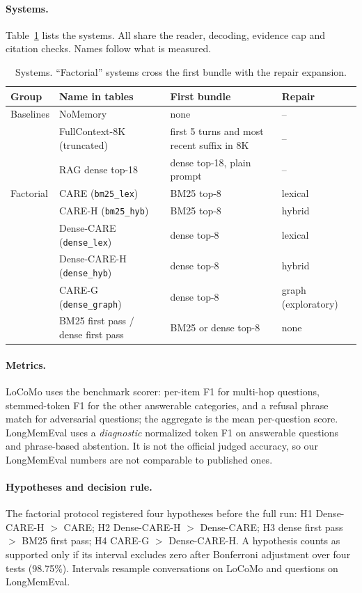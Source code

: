 \documentclass[10pt]{article}
\theoremstyle{plain}
\begin{document}
\paragraph{Systems.} Table~\ref{tab:systems} lists the systems. All share the reader, decoding, evidence cap
and citation checks. Names follow what is measured.

\begin{table}[t]
\centering
\caption{Systems. ``Factorial'' systems cross the first bundle with the repair expansion.}
\label{tab:systems}
\small
\begin{tabular}{llll}
\toprule
Group & Name in tables & First bundle & Repair \\
\midrule
Baselines & NoMemory & none & -- \\
 & FullContext-8K (truncated) & first 5 turns and most recent suffix in 8K & -- \\
 & RAG dense top-18 & dense top-18, plain prompt & -- \\
\midrule
Factorial & CARE (\texttt{bm25\_lex}) & BM25 top-8 & lexical \\
 & CARE-H (\texttt{bm25\_hyb}) & BM25 top-8 & hybrid \\
 & Dense-CARE (\texttt{dense\_lex}) & dense top-8 & lexical \\
 & Dense-CARE-H (\texttt{dense\_hyb}) & dense top-8 & hybrid \\
 & CARE-G (\texttt{dense\_graph}) & dense top-8 & graph (exploratory) \\
 & BM25 first pass / dense first pass & BM25 or dense top-8 & none \\
\bottomrule
\end{tabular}
\end{table}

\paragraph{Metrics.} LoCoMo uses the benchmark scorer: per-item F1 for multi-hop questions, stemmed-token F1
for the other answerable categories, and a refusal phrase match for adversarial questions; the aggregate is the
mean per-question score. LongMemEval uses a \emph{diagnostic} normalized token F1 on answerable questions and
phrase-based abstention. It is not the official judged accuracy, so our LongMemEval numbers are not comparable
to published ones.

\paragraph{Hypotheses and decision rule.} The factorial protocol registered four hypotheses before the
full run: H1 Dense-CARE-H $>$ CARE; H2 Dense-CARE-H $>$ Dense-CARE; H3 dense first pass $>$ BM25 first pass;
H4 CARE-G $>$ Dense-CARE-H. A hypothesis counts as supported only if its interval excludes zero after
Bonferroni adjustment over four tests (98.75\%). Intervals resample conversations on LoCoMo and questions on
LongMemEval.
\end{document}
